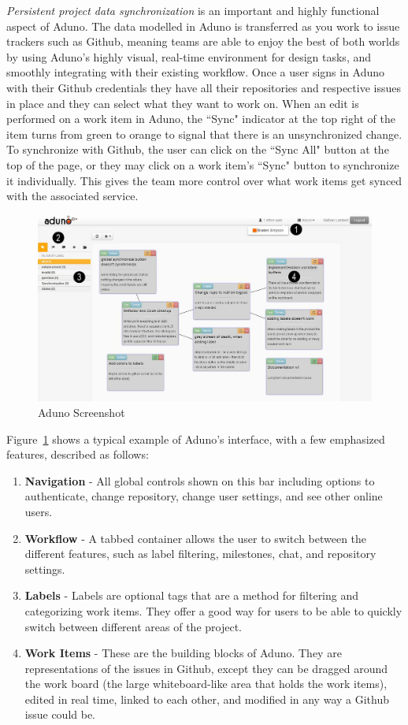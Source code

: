 \documentclass[conference]{IEEEtran}
\begin{document}
\textit{Persistent project data synchronization} is an important and highly functional aspect of Aduno.  The data modelled in Aduno is transferred as you work to issue trackers such as Github, meaning teams are able to enjoy the best of both worlds by using Aduno's highly visual, real-time environment for design tasks, and smoothly integrating with their existing workflow. Once a user signs in Aduno with their Github credentials they have all their repositories and respective issues in place and they can select what they want to work on. When an edit is performed on a work item in Aduno, the ``Sync" indicator at the top right of the item turns from green to orange to signal that there is an unsynchronized change. To synchronize with Github, the user can click on the ``Sync All" button at the top of the page, or they may click on a work item's ``Sync" button to synchronize it individually. This gives the team more control over what work items get synced with the associated service.

\begin{figure}[t]
\includegraphics[width=\textwidth]{aduno-screenshot}
\caption{Aduno Screenshot}
\label{fig:adunoscreenshot}
\end{figure}


Figure~\ref{fig:adunoscreenshot} shows a typical example of Aduno's interface, with a few emphasized features, described as follows: 
\begin{enumerate}
	\item \textbf{Navigation} - All global controls shown on this bar including options to authenticate, change repository, change user settings, and see other online users.
	\item \textbf{Workflow} - A tabbed container allows the user to switch between the different features, such as label filtering, milestones, chat, and repository settings.  
	\item \textbf{Labels} - Labels are optional tags that are a method for filtering and categorizing work items.  They offer a good way for users to be able to quickly switch between different areas of the project.  
	\item \textbf{Work Items} - These are the building blocks of Aduno. They are representations of the issues in Github, except they can be dragged around the work board (the large whiteboard-like area that holds the work items), edited in real time, linked to each other, and modified in any way a Github issue could be. 
\end{enumerate}
\end{document}

